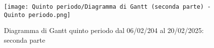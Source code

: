 \begin{figure}[h] 
    \centering
    \texttt{[image: Quinto periodo/Diagramma di Gantt (seconda parte) - Quinto periodo.png]}
    \caption{Diagramma di Gantt quinto periodo dal 06/02/204 al 20/02/2025: seconda parte} 
    \label{fig: Diagramma di Gantt quinto periodo dal 06/02/204 al 20/02/2025: seconda parte}
\end{figure}

\newpage